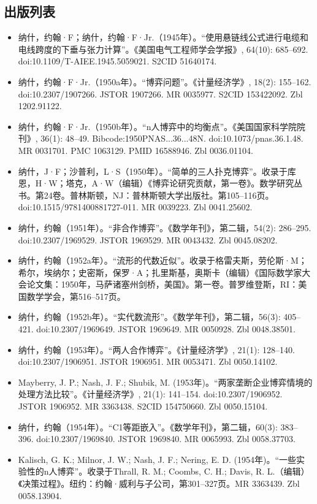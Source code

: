 \subsection{出版列表}  
\begin{itemize}
\item 纳什，约翰·F；纳什，约翰·F·Jr.（1945年）。“使用悬链线公式进行电缆和电线跨度的下垂与张力计算”。《美国电气工程师学会学报》, 64(10): 685–692. doi:10.1109/T-AIEE.1945.5059021. S2CID 51640174.  
\item 纳什，约翰·F·Jr.（1950a年）。“博弈问题”。《计量经济学》, 18(2): 155–162. doi:10.2307/1907266. JSTOR 1907266. MR 0035977. S2CID 153422092. Zbl 1202.91122.  
\item 纳什，约翰·F·Jr.（1950b年）。“n人博弈中的均衡点”。《美国国家科学院院刊》, 36(1): 48–49. Bibcode:1950PNAS...36...48N. doi:10.1073/pnas.36.1.48. MR 0031701. PMC 1063129. PMID 16588946. Zbl 0036.01104.  
\item 纳什，J·F；沙普利，L·S（1950年）。“简单的三人扑克博弈”。收录于库恩，H·W；塔克，A·W（编辑）《博弈论研究贡献，第一卷》。数学研究丛书。第24卷。普林斯顿，NJ：普林斯顿大学出版社。第105–116页。doi:10.1515/9781400881727-011. MR 0039223. Zbl 0041.25602.  
\item 纳什，约翰（1951年）。“非合作博弈”。《数学年刊》，第二辑，54(2): 286–295. doi:10.2307/1969529. JSTOR 1969529. MR 0043432. Zbl 0045.08202.  
\item 纳什，约翰（1952a年）。“流形的代数近似”。收录于格雷夫斯，劳伦斯·M；希尔，埃纳尔；史密斯，保罗·A；扎里斯基，奥斯卡（编辑）《国际数学家大会论文集：1950年，马萨诸塞州剑桥，美国》。第一卷。普罗维登斯，RI：美国数学学会，第516–517页。  
\item 纳什，约翰（1952b年）。“实代数流形”。《数学年刊》，第二辑，56(3): 405–421. doi:10.2307/1969649. JSTOR 1969649. MR 0050928. Zbl 0048.38501.  
\item 纳什，约翰（1953年）。“两人合作博弈”。《计量经济学》, 21(1): 128–140. doi:10.2307/1906951. JSTOR 1906951. MR 0053471. Zbl 0050.14102.
\item Mayberry, J. P.; Nash, J. F.; Shubik, M. (1953年)。“两家垄断企业博弈情境的处理方法比较”。《计量经济学》, 21(1): 141–154. doi:10.2307/1906952. JSTOR 1906952. MR 3363438. S2CID 154750660. Zbl 0050.15104.  
\item 纳什，约翰（1954年）。“C1等距嵌入”。《数学年刊》，第二辑，60(3): 383–396. doi:10.2307/1969840. JSTOR 1969840. MR 0065993. Zbl 0058.37703.  
\item Kalisch, G. K.; Milnor, J. W.; Nash, J. F.; Nering, E. D. (1954年)。“一些实验性的n人博弈”。收录于Thrall, R. M.; Coombs, C. H.; Davis, R. L.（编辑）《决策过程》。纽约：约翰·威利与子公司，第301–327页。MR 3363439. Zbl 0058.13904.  

\end{itemize}
